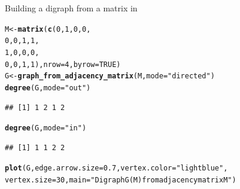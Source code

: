 \documentclass[aspectratio=169]{beamer}\usepackage[]{graphicx}\usepackage[]{xcolor}
\makeatletter
\newcommand{\hlnum}[1]{\textcolor[rgb]{0.686,0.059,0.569}{#1}}%
\newcommand{\hlsng}[1]{\textcolor[rgb]{0.192,0.494,0.8}{#1}}%
\newcommand{\hldef}[1]{\textcolor[rgb]{0.345,0.345,0.345}{#1}}%
\newcommand{\hlkwb}[1]{\textcolor[rgb]{0.69,0.353,0.396}{#1}}%
\newcommand{\hlkwc}[1]{\textcolor[rgb]{0.333,0.667,0.333}{#1}}%
\newcommand{\hlkwd}[1]{\textcolor[rgb]{0.737,0.353,0.396}{\textbf{#1}}}%
\newenvironment{kframe}{%
 \def\at@end@of@kframe{}%
 \ifinner\ifhmode%
  \def\at@end@of@kframe{\end{minipage}}%
  \begin{minipage}{\columnwidth}%
 \fi\fi%
 \def\FrameCommand##1{\hskip\@totalleftmargin \hskip-\fboxsep
 \colorbox{shadecolor}{##1}\hskip-\fboxsep
     \hskip-\linewidth \hskip-\@totalleftmargin \hskip\columnwidth}%
 \MakeFramed {\advance\hsize-\width
   \@totalleftmargin\z@ \linewidth\hsize
   \@setminipage}}%
 {\par\unskip\endMakeFramed%
 \at@end@of@kframe}
\newenvironment{knitrout}{}{} %
\makeatother
\begin{document}
\begin{frame}[fragile]{Building a digraph from a matrix in }
\begin{knitrout}
\color{fgcolor}\begin{kframe}
\begin{alltt}
\hldef{M} \hlkwb{<-} \hlkwd{matrix}\hldef{(}\hlkwd{c}\hldef{(}\hlnum{0}\hldef{,} \hlnum{1}\hldef{,} \hlnum{0}\hldef{,} \hlnum{0}\hldef{,}
              \hlnum{0}\hldef{,} \hlnum{0}\hldef{,} \hlnum{1}\hldef{,} \hlnum{1}\hldef{,}
              \hlnum{1}\hldef{,} \hlnum{0}\hldef{,} \hlnum{0}\hldef{,} \hlnum{0}\hldef{,}
              \hlnum{0}\hldef{,} \hlnum{0}\hldef{,} \hlnum{1}\hldef{,} \hlnum{1}\hldef{),} \hlkwc{nrow} \hldef{=} \hlnum{4}\hldef{,} \hlkwc{byrow} \hldef{=} \hlnum{TRUE}\hldef{)}
\hldef{G} \hlkwb{<-} \hlkwd{graph_from_adjacency_matrix}\hldef{(M,} \hlkwc{mode} \hldef{=} \hlsng{"directed"}\hldef{)}
\hlkwd{degree}\hldef{(G,} \hlkwc{mode} \hldef{=} \hlsng{"out"}\hldef{)}
\end{alltt}
\begin{verbatim}
## [1] 1 2 1 2
\end{verbatim}
\begin{alltt}
\hlkwd{degree}\hldef{(G,} \hlkwc{mode} \hldef{=} \hlsng{"in"}\hldef{)}
\end{alltt}
\begin{verbatim}
## [1] 1 1 2 2
\end{verbatim}
\begin{alltt}
\hlkwd{plot}\hldef{(G,} \hlkwc{edge.arrow.size} \hldef{=} \hlnum{0.7}\hldef{,} \hlkwc{vertex.color} \hldef{=} \hlsng{"lightblue"}\hldef{,}
     \hlkwc{vertex.size} \hldef{=} \hlnum{30}\hldef{,} \hlkwc{main} \hldef{=} \hlsng{"Digraph G(M) from adjacency matrix M"}\hldef{)}
\end{alltt}
\end{kframe}
\end{knitrout}
\end{frame}




\end{document}

